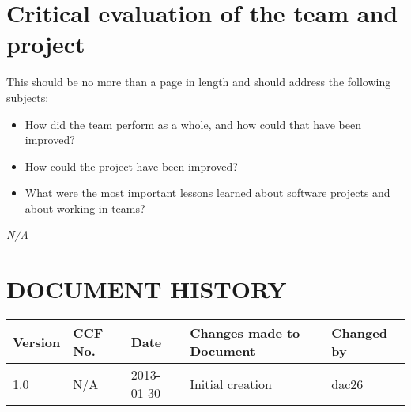 \documentclass{project}
\begin{document}
\section{Critical evaluation of the team and project}
This should be no more than a page in length and should address
the following subjects:
\begin{itemize}
	\item How did the team perform as a whole, and how could that have been improved?
	\item How could the project have been improved?
	\item What were the most important lessons learned about software projects and about working in teams?
\end{itemize}
\clearpage
{}
\begin{thebibliography}{5}
\bibitem{} \emph{N/A}
\end{thebibliography}
\clearpage
{}
\section*{DOCUMENT HISTORY}
\begin{tabular}{|l | l | l | l | l |}
\hline
Version & CCF No. & Date & Changes made to Document & Changed by \\
\hline
1.0 & N/A & 2013-01-30 & Initial creation & dac26 \\
\hline
\end{tabular}
\label{thelastpage}
\end{document}
